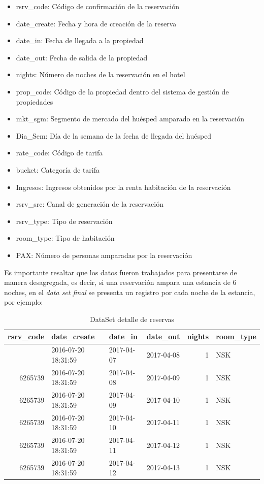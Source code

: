 \begin{itemize}
  \item rsrv\_code: Código de confirmación de la reservación
  \item date\_create: Fecha y hora de creación de la reserva
  \item date\_in: Fecha de llegada a la propiedad
  \item date\_out: Fecha de salida de la propiedad
  \item nights: Número de noches de la reservación en el hotel
  \item prop\_code: Código de la propiedad dentro del sistema de gestión de propiedades
  \item mkt\_sgm: Segmento de mercado del huésped amparado en la reservación
  \item Dia\_Sem: Día de la semana de la fecha de llegada del huésped
  \item rate\_code: Código de tarifa
  \item bucket: Categoría de tarifa
  \item Ingresos: Ingresos obtenidos por la renta habitación de la reservación
  \item rsrv\_src: Canal de generación de la reservación
  \item rsrv\_type: Tipo de reservación
  \item room\_type: Tipo de habitación
  \item PAX: Número de personas amparadas por la reservación
\end{itemize}

Es importante resaltar que los datos fueron trabajados para presentarse de manera desagregada, es decir, si una reservación ampara una estancia de 6 noches, en el \emph{data set final} se presenta un registro por cada noche de la estancia, por ejemplo:

\begin{knitrout}
\color{fgcolor}\begin{table}[H]
\centering{}

\begin{tabular}{r|l|l|l|r|l}
\hiderowcolors
\hline
rsrv\_code & date\_create & date\_in & date\_out & nights & room\_type\\
\hline
\showrowcolors
6265739 & 2016-07-20 18:31:59 & 2017-04-07 & 2017-04-08 & 1 & NSK\\
\hline
6265739 & 2016-07-20 18:31:59 & 2017-04-08 & 2017-04-09 & 1 & NSK\\
\hline
6265739 & 2016-07-20 18:31:59 & 2017-04-09 & 2017-04-10 & 1 & NSK\\
\hline
6265739 & 2016-07-20 18:31:59 & 2017-04-10 & 2017-04-11 & 1 & NSK\\
\hline
6265739 & 2016-07-20 18:31:59 & 2017-04-11 & 2017-04-12 & 1 & NSK\\
\hline
6265739 & 2016-07-20 18:31:59 & 2017-04-12 & 2017-04-13 & 1 & NSK\\
\hline
\end{tabular}
\caption{DataSet detalle de reservas} 
\end{table}
\end{knitrout}


